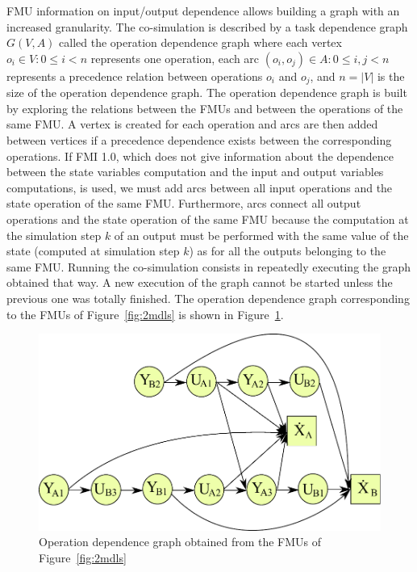 FMU information on input/output dependence allows building a graph with an increased granularity. The co-simulation is described by a task dependence graph $G(V,A)$ called the operation dependence graph where each vertex $o_i \in V: 0 \leq i < n$ represents one operation, each arc $(o_i,o_j) \in A: 0 \leq i,j < n$ represents a precedence relation between operations $o_i$ and $o_j$, and $n = |V|$ is the size of the operation dependence graph. The operation dependence graph is built by exploring the relations between the FMUs and between the operations of the same FMU. A vertex is created for each operation and arcs are then added between vertices if a precedence dependence exists between the corresponding operations. If FMI 1.0, which does not give information about the dependence between the state variables computation and the input and output variables computations, is used, we must add arcs between all input operations and the state operation of the same FMU. Furthermore, arcs connect all output operations and the state operation of the same FMU because the computation at the simulation step $k$ of an output must be performed with the same value of the state (computed at simulation step $k$) as for all the outputs belonging to the same FMU. Running the co-simulation consists in repeatedly executing the graph obtained that way. A new execution of the graph cannot be started unless the previous one was totally finished. The operation dependence graph corresponding to the FMUs of Figure~\ref{fig:2mdls} is shown in Figure~\ref{fig:dag}.

\begin{figure}[htb]
\centering
  \includegraphics[scale=0.5]{figures/Operation_Graph_Two_Models}
\caption{Operation dependence graph obtained from the FMUs of Figure~\ref{fig:2mdls}}
\label{fig:dag}
\end{figure} 

